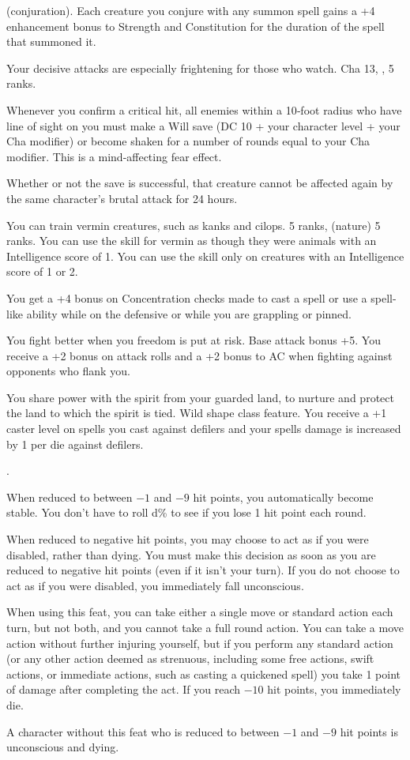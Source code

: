 { (conjuration).}
{Each creature you conjure with any summon spell gains a +4 enhancement bonus to Strength and Constitution for the duration of the spell that summoned it.}

{Your decisive attacks are especially frightening for those who watch.}
{Cha 13, ,  5 ranks.}
{Whenever you confirm a critical hit, all enemies within a 10‐foot radius who have line of sight on you must make a Will save (DC 10 + \onehalf your character level + your Cha modifier) or become shaken for a
number of rounds equal to your Cha modifier. This is a mind‐affecting fear effect.

Whether or not the save is successful, that creature cannot be affected again by the same character's brutal
attack for 24 hours.}{}{}

{You can train vermin creatures, such as kanks and cilops.}
{ 5 ranks,  (nature) 5 ranks.}
{You can use the  skill for vermin as though they were animals with an Intelligence score of 1.}
{You can use the  skill only on creatures with an Intelligence score of 1 or 2.}
{}

{You get a +4 bonus on Concentration checks made to cast a spell or use a spell-like ability while on the defensive or while you are grappling or pinned.}

{You fight better when you freedom is put at risk.}
{Base attack bonus +5.}
{You receive a +2 bonus on attack rolls and a +2 bonus to AC when fighting against opponents who flank you.}
{}{}

{You share power with the spirit from your guarded land, to nurture and protect the land to which the spirit is tied.}
{Wild shape class feature.}
{You receive a +1 caster level on spells you cast against defilers and your spells damage is increased by 1 per die against defilers.}
{}{}

{.}
{When reduced to between $-1$ and $-9$ hit points, you automatically become stable. You don't have to roll d\% to see if you lose 1 hit point each round.

When reduced to negative hit points, you may choose to act as if you were disabled, rather than dying. You must make this decision as soon as you are reduced to negative hit points (even if it isn't your turn). If you do not choose to act as if you were disabled, you immediately fall unconscious.

When using this feat, you can take either a single move or standard action each turn, but not both, and you cannot take a full round action. You can take a move action without further injuring yourself, but if you perform any standard action (or any other action deemed as strenuous, including some free actions, swift actions, or immediate actions, such as casting a quickened spell) you take 1 point of damage after completing the act. If you reach $-10$ hit points, you immediately die.}
{A character without this feat who is reduced to between $-1$ and $-9$ hit points is unconscious and dying.}
{}

